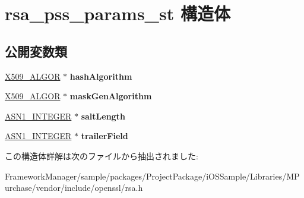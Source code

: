 \hypertarget{structrsa__pss__params__st}{}\section{rsa\+\_\+pss\+\_\+params\+\_\+st 構造体}
\label{structrsa__pss__params__st}
\subsection*{公開変数類}
\begin{DoxyCompactItemize}
\item 
\hypertarget{structrsa__pss__params__st_aac829ac297745706cbaf333d81b4de9e}{}\hyperlink{struct_x509__algor__st}{X509\+\_\+\+A\+L\+G\+O\+R} $\ast$ {\bfseries hash\+Algorithm}\label{structrsa__pss__params__st_aac829ac297745706cbaf333d81b4de9e}

\item 
\hypertarget{structrsa__pss__params__st_a39f7b07fe870a2d415ca2edd68e68889}{}\hyperlink{struct_x509__algor__st}{X509\+\_\+\+A\+L\+G\+O\+R} $\ast$ {\bfseries mask\+Gen\+Algorithm}\label{structrsa__pss__params__st_a39f7b07fe870a2d415ca2edd68e68889}

\item 
\hypertarget{structrsa__pss__params__st_aa3831adeab05f41488cc226fff064091}{}\hyperlink{structasn1__string__st}{A\+S\+N1\+\_\+\+I\+N\+T\+E\+G\+E\+R} $\ast$ {\bfseries salt\+Length}\label{structrsa__pss__params__st_aa3831adeab05f41488cc226fff064091}

\item 
\hypertarget{structrsa__pss__params__st_a67aede448229164c1c5e359c3020ae53}{}\hyperlink{structasn1__string__st}{A\+S\+N1\+\_\+\+I\+N\+T\+E\+G\+E\+R} $\ast$ {\bfseries trailer\+Field}\label{structrsa__pss__params__st_a67aede448229164c1c5e359c3020ae53}

\end{DoxyCompactItemize}


この構造体詳解は次のファイルから抽出されました\+:\begin{DoxyCompactItemize}
\item 
Framework\+Manager/sample/packages/\+Project\+Package/i\+O\+S\+Sample/\+Libraries/\+M\+Purchase/vendor/include/openssl/rsa.\+h\end{DoxyCompactItemize}
